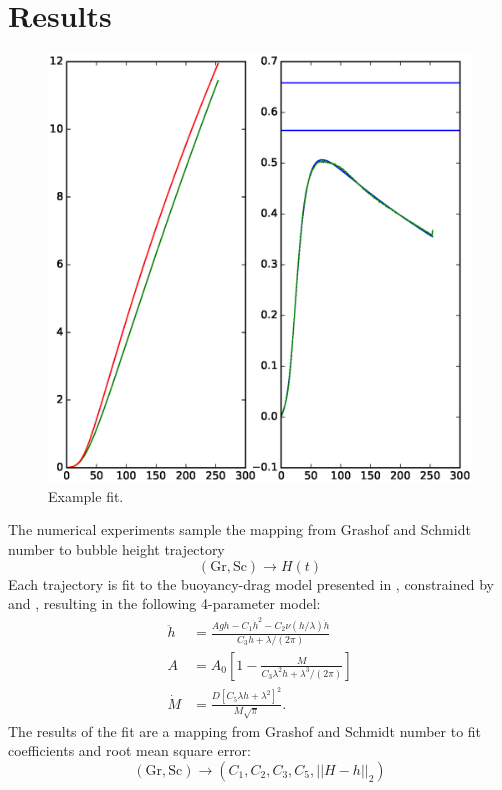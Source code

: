 \section{Results}

\begin{figure}
\includegraphics[width=\columnwidth]{figs/H-0.0016-0.0002.eps}
\caption{ 
  Example fit.
}
\end{figure}

The numerical experiments sample the mapping from Grashof and Schmidt number to bubble height trajectory
\begin{equation*}
\left(\text{Gr}, \text{Sc}\right) \rightarrow H(t)
\end{equation*}
Each trajectory is fit to the buoyancy-drag model presented in , constrained by  and , resulting in the following 4-parameter model:
\begin{align}
\ddot{h} &= \frac{A g h - C_1 \dot{h}^2 - C_2 \nu (h/\lambda) \dot{h}}{ C_3 h + \lambda/(2\pi) } \\
A &= A_0 \left[ 1 - \frac{M}{C_3 \lambda^2 h  + \lambda^3 / (2\pi)} \right]  \\
\dot{M} &= \frac{D \left[C_5 \lambda h + \lambda^2\right] ^2}{M \sqrt{\pi}} .
\end{align}
The results of the fit are a mapping from Grashof and Schmidt number to fit coefficients and root mean square error:
\begin{equation}
\left(\text{Gr}, \text{Sc}\right) \rightarrow \left(C_1, C_2, C_3, C_5, || H - h ||_2\right) 
\end{equation}

